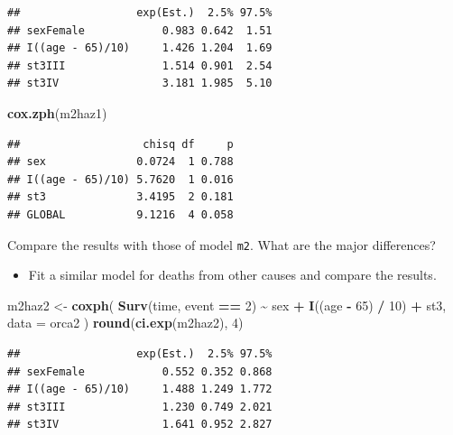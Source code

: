 \documentclass[
]{book}
\newenvironment{Shaded}{\begin{snugshade}}{\end{snugshade}}
\newcommand{\AttributeTok}[1]{\textcolor[rgb]{0.13,0.29,0.53}{#1}}
\newcommand{\DecValTok}[1]{\textcolor[rgb]{0.00,0.00,0.81}{#1}}
\newcommand{\FunctionTok}[1]{\textcolor[rgb]{0.13,0.29,0.53}{\textbf{#1}}}
\newcommand{\NormalTok}[1]{#1}
\newcommand{\OtherTok}[1]{\textcolor[rgb]{0.56,0.35,0.01}{#1}}
\newcommand{\SpecialCharTok}[1]{\textcolor[rgb]{0.81,0.36,0.00}{\textbf{#1}}}
\providecommand{\tightlist}{%
  \setlength{\itemsep}{0pt}\setlength{\parskip}{0pt}}
\theoremstyle{definition}
\theoremstyle{definition}
\theoremstyle{definition}
\theoremstyle{definition}
\theoremstyle{remark}
\begin{document}
\begin{verbatim}
##                  exp(Est.)  2.5% 97.5%
## sexFemale            0.983 0.642  1.51
## I((age - 65)/10)     1.426 1.204  1.69
## st3III               1.514 0.901  2.54
## st3IV                3.181 1.985  5.10
\end{verbatim}

\begin{Shaded}
\begin{Highlighting}[]
\FunctionTok{cox.zph}\NormalTok{(m2haz1)}
\end{Highlighting}
\end{Shaded}

\begin{verbatim}
##                   chisq df     p
## sex              0.0724  1 0.788
## I((age - 65)/10) 5.7620  1 0.016
## st3              3.4195  2 0.181
## GLOBAL           9.1216  4 0.058
\end{verbatim}

Compare the results with those of model \texttt{m2}. What are the major
differences?

\begin{itemize}
\tightlist
\item
  Fit a similar model for deaths from other causes and compare the
  results.
\end{itemize}

\begin{Shaded}
\begin{Highlighting}[]
\NormalTok{m2haz2 }\OtherTok{\textless{}{-}} 
  \FunctionTok{coxph}\NormalTok{(}
    \FunctionTok{Surv}\NormalTok{(time, event }\SpecialCharTok{==} \DecValTok{2}\NormalTok{) }\SpecialCharTok{\textasciitilde{}}\NormalTok{ sex }\SpecialCharTok{+} \FunctionTok{I}\NormalTok{((age }\SpecialCharTok{{-}} \DecValTok{65}\NormalTok{) }\SpecialCharTok{/} \DecValTok{10}\NormalTok{) }\SpecialCharTok{+}\NormalTok{ st3, }
    \AttributeTok{data =}\NormalTok{ orca2}
\NormalTok{  )}
\FunctionTok{round}\NormalTok{(}\FunctionTok{ci.exp}\NormalTok{(m2haz2), }\DecValTok{4}\NormalTok{)}
\end{Highlighting}
\end{Shaded}

\begin{verbatim}
##                  exp(Est.)  2.5% 97.5%
## sexFemale            0.552 0.352 0.868
## I((age - 65)/10)     1.488 1.249 1.772
## st3III               1.230 0.749 2.021
## st3IV                1.641 0.952 2.827
\end{verbatim}
\end{document}
